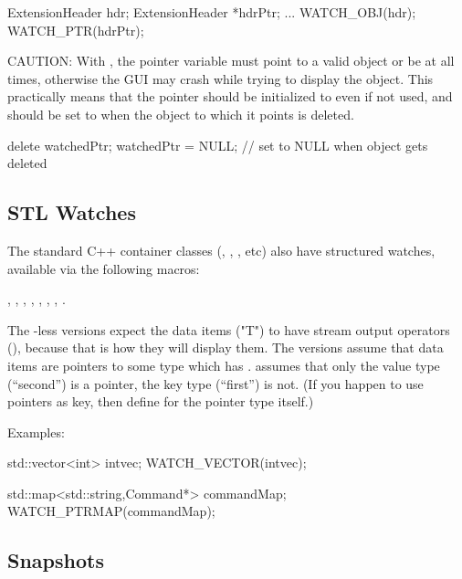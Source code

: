 \begin{cpp}
ExtensionHeader hdr;
ExtensionHeader *hdrPtr;
...
WATCH_OBJ(hdr);
WATCH_PTR(hdrPtr);
\end{cpp}

CAUTION: With , the pointer variable must point to a valid
object or be  at all times, otherwise the GUI may crash
while trying to display the object. This practically means that
the pointer should be initialized to  even if not used, and
should be set to  when the object to which it points is deleted.

\begin{cpp}
delete watchedPtr;
watchedPtr = NULL;  // set to NULL when object gets deleted
\end{cpp}


\subsection{STL Watches}

The standard C++ container classes (, , , etc)
also have structured watches, available via the following macros:

, ,
, ,
, ,
, .

The -less versions expect the data items ("T") to have
stream output operators (), because that is how
they will display them. The  versions assume that
data items are pointers to some type which has .
 assumes that only the value type (``second'')
is a pointer, the key type (``first'') is not. (If you happen to use
pointers as key, then define  for the pointer type
itself.)

Examples:

\begin{cpp}
std::vector<int> intvec;
WATCH_VECTOR(intvec);

std::map<std::string,Command*> commandMap;
WATCH_PTRMAP(commandMap);
\end{cpp}



\subsection{Snapshots}
\label{sec:ch-sim-lib:snapshots}

